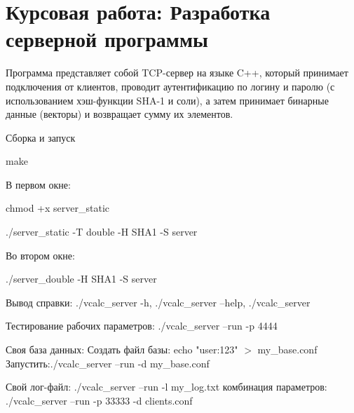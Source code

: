 \chapter{Курсовая работа\+: Разработка серверной программы}
\hypertarget{md_README}{}\label{md_README}
\label{md_README_autotoc_md0}%
%
Программа представляет собой TCP-\/сервер на языке C++, который принимает подключения от клиентов, проводит аутентификацию по логину и паролю (с использованием хэш-\/функции SHA-\/1 и соли), а затем принимает бинарные данные (векторы) и возвращает сумму их элементов.

Сборка и запуск

make

В первом окне\+:

chmod +x server\+\_\+static

./server\+\_\+static -\/T double -\/H SHA1 -\/S server

Во втором окне\+:

./server\+\_\+double -\/H SHA1 -\/S server

Вывод справки\+: ./vcalc\+\_\+server -\/h, ./vcalc\+\_\+server --help, ./vcalc\+\_\+server

Тестирование рабочих параметров\+: ./vcalc\+\_\+server --run -\/p 4444

Своя база данных\+: Создать файл базы\+: echo "{}user\+:123"{} \texorpdfstring{$>$}{>} my\+\_\+base.\+conf Запустить\+:./vcalc\+\_\+server --run -\/d my\+\_\+base.\+conf

Свой лог-\/файл\+: ./vcalc\+\_\+server --run -\/l my\+\_\+log.\+txt комбинация параметров\+: ./vcalc\+\_\+server --run -\/p 33333 -\/d clients.\+conf 